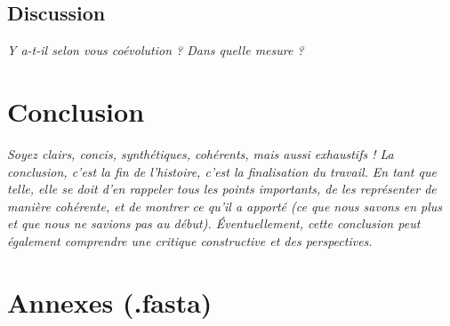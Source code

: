 \documentclass[a4paper, 11pt]{article}
\begin{document}
\subsection{Discussion}
\emph{Y a-t-il selon vous coévolution ? Dans quelle mesure ?}
\section{Conclusion}
\emph{Soyez clairs, concis, synthétiques, cohérents, mais aussi exhaustifs ! La conclusion, c’est la fin de l’histoire, c’est la finalisation du travail. En tant que telle, elle se doit d’en rappeler tous les points importants, de les représenter de manière cohérente, et de montrer ce qu’il a apporté (ce que nous savons en plus et que nous ne savions pas au début). Éventuellement, cette conclusion peut également comprendre une critique constructive et des perspectives.}

\printbibliography

\section{Annexes (.fasta)}
\end{document}
